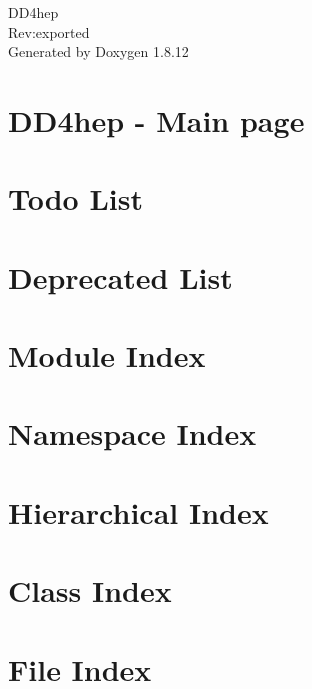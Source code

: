 \documentclass[twoside]{book}
\newcommand{\+}{\discretionary{\mbox{\scriptsize$\hookleftarrow$}}{}{}}
\newcommand{\clearemptydoublepage}{%
  \newpage{\pagestyle{empty}\cleardoublepage}%
}
\begin{document}
\hypersetup{pageanchor=false,
             bookmarksnumbered=true,
             pdfencoding=unicode
            }
\begin{titlepage}
\vspace*{7cm}
\begin{center}%
{\Large D\+D4hep \\[1ex]\large Rev\+:exported }\\
\vspace*{1cm}
{\large Generated by Doxygen 1.8.12}\\
\end{center}
\end{titlepage}
\clearemptydoublepage
{}
\tableofcontents
\clearemptydoublepage
{}
\hypersetup{pageanchor=true}

\chapter{D\+D4hep -\/ Main page}
\label{index}\hypertarget{index}{}
\chapter{Todo List}
\label{todo}
\hypertarget{todo}{}

\chapter{Deprecated List}
\label{deprecated}
\hypertarget{deprecated}{}

\chapter{Module Index}

\chapter{Namespace Index}

\chapter{Hierarchical Index}

\chapter{Class Index}

\chapter{File Index}

\end{document}
